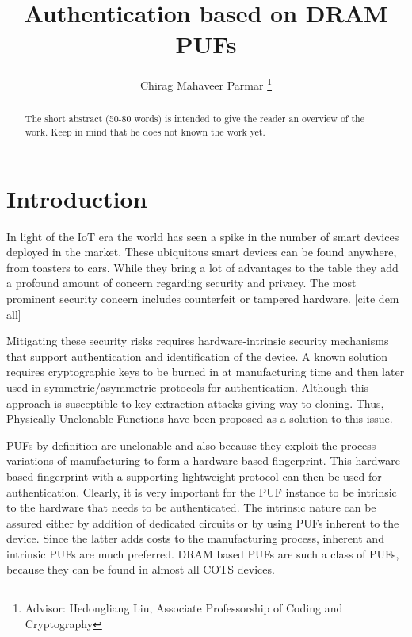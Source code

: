 \documentclass[journal, a4paper]{IEEEtran}
\begin{document}
\title{Authentication based on DRAM PUFs}
\author{Chirag Mahaveer Parmar
\thanks{Advisor: Hedongliang Liu, Associate Professorship of Coding and Cryptography}}
\maketitle

\begin{abstract}
The short abstract (50-80 words) is intended to give the reader an overview of the work.
Keep in mind that he does not known the work yet.
\end{abstract}

\section{Introduction}
 In light of the IoT era the world has seen a spike in the number of smart devices deployed in the market. These ubiquitous smart devices can be found anywhere, from toasters to cars. While they bring a lot of advantages to the table they add a profound amount of concern regarding security and privacy. The most prominent security concern includes counterfeit or tampered hardware. [cite dem all]

Mitigating these security risks requires hardware-intrinsic security mechanisms that support authentication and identification of the device. A known solution requires cryptographic keys to be burned in at manufacturing time and then later used in symmetric/asymmetric protocols for authentication. Although this approach is susceptible to key extraction attacks giving way to cloning. Thus, Physically Unclonable Functions have been proposed as a solution to this issue.

PUFs by definition are unclonable and also because they exploit the process variations of manufacturing to form a hardware-based fingerprint. This hardware based fingerprint with a supporting lightweight protocol can then be used for authentication. Clearly, it is very important for the PUF instance to be intrinsic to the hardware that needs to be authenticated. The intrinsic nature can be assured either by addition of dedicated circuits or by using PUFs inherent to the device. Since the latter adds costs to the manufacturing process, inherent and intrinsic PUFs are much preferred. DRAM based PUFs are such a class of PUFs, because they can be found in almost all COTS devices.
\end{document}

